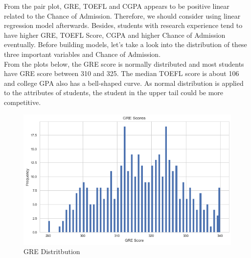 \documentclass[12pt]{article}
\begin{document}
\begin{sloppypar}
From the pair plot, GRE, TOEFL and CGPA appears to be positive linear related to the Chance of Admission. Therefore, we should consider using linear regression model afterwards. Besides, students with research experience tend to have higher GRE, TOEFL Score, CGPA and higher Chance of Admission eventually. Before building models, let's take a look into the distribution of these three important variables and Chance of Admission.\\
From the plots below, the GRE score is normally distributed and most students have GRE score between 310 and 325. The median TOEFL score is about 106 and college GPA also has a bell-shaped curve. As normal distribution is applied to the attributes of students, the student in the upper tail could be more competitive.


\begin{figure}[H]
    \centering
    \includegraphics[scale = 0.5]{GRE.png}
    \caption{GRE Distritbution}
\end{figure}
 

\end{sloppypar}
\end{document}
